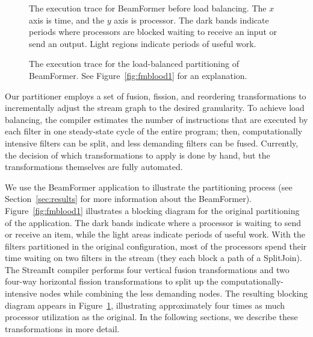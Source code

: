 \begin{figure}[t]
\vspace{-6pt}
\begin{minipage}{3.1in}
\vspace{-12pt}
\caption{\protect\small The execution trace for BeamFormer before load
balancing.  The $x$ axis is time, and the $y$ axis is processor.  The
dark bands indicate periods where processors are blocked waiting to
receive an input or send an output.  Light regions indicate periods of
useful work.  \protect\label{fig:fmblood1}}
\end{minipage}
\hspace{0.3in}
\vspace{-12pt}
\begin{minipage}{3.1in}
\caption{\protect\small The execution trace for the load-balanced
partitioning of BeamFormer.  See Figure~\ref{fig:fmblood1} for an
explanation. \protect\label{fig:fmblood2}}
\end{minipage}
\vspace{-6pt}
\end{figure}

Our partitioner employs a set of fusion, fission, and reordering
transformations to incrementally adjust the stream graph to the
desired granularity.  To achieve load balancing, the compiler
estimates the number of instructions that are executed by each filter
in one steady-state cycle of the entire program; then, computationally
intensive filters can be split, and less demanding filters can be
fused.  Currently, the decision of which transformations to apply is
done by hand, but the transformations themselves are fully automated.

We use the BeamFormer application \cite{pca} to illustrate the
partitioning process (see Section~\ref{sec:results} for more
information about the BeamFormer).  Figure~\ref{fig:fmblood1}
illustrates a blocking diagram for the original partitioning of the
application.  The dark bands indicate where a processor is waiting to
send or receive an item, while the light areas indicate periods of
useful work.  With the filters partitioned in the original
configuration, most of the processors spend their time waiting on two
filters in the stream (they each block a path of a SplitJoin).  The
StreamIt compiler performs four vertical fusion transformations and
two four-way horizontal fission transformations to split up the
computationally-intensive nodes while combining the less demanding
nodes.  The resulting blocking diagram appears in
Figure~\ref{fig:fmblood2}, illustrating approximately four times as
much processor utilization as the original.  In the following
sections, we describe these transformations in more detail.

